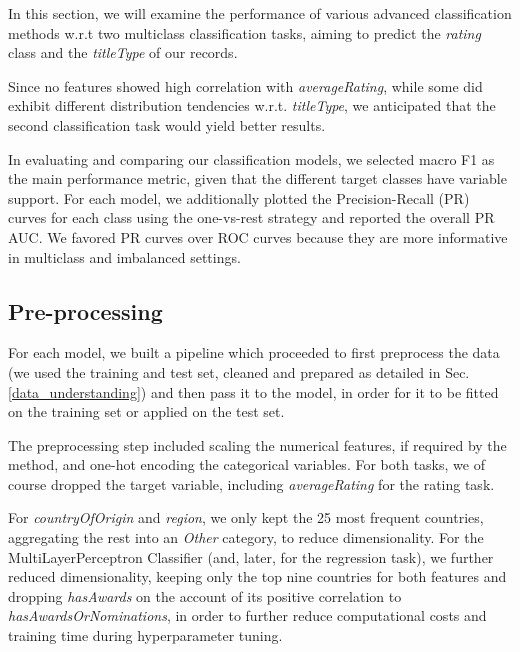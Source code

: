 In this section, we  will examine the performance of various advanced classification methods w.r.t two multiclass classification tasks, aiming to predict the \textit{rating} class and the \textit{titleType} of our records.

Since no features showed high correlation with \textit{averageRating}, while some did exhibit different distribution tendencies w.r.t. \textit{titleType}, we anticipated that the second classification task would yield better results.

In evaluating and comparing our classification models, we selected macro F1 as the main performance metric, given that the different target classes have variable support. For each model, we additionally plotted the Precision-Recall (PR) curves for each class using the one-vs-rest strategy and reported the overall PR AUC. We favored PR curves over ROC curves because they are more informative in multiclass and imbalanced settings.

\subsection{Pre-processing}
\label{classification_preprocessing}
For each model, we built a pipeline which proceeded to first preprocess the data (we used the training and test set, cleaned and prepared as detailed in Sec. \ref{data_understanding}) and then pass it to the model, in order for it to be fitted on the training set or applied on the test set.

The preprocessing step included scaling the numerical features, if required by the method, and one-hot encoding the categorical variables. For both tasks, we of course dropped the target variable, including \textit{averageRating} for the rating task.

For \textit{countryOfOrigin} and \textit{region}, we only kept the 25 most frequent countries, aggregating the rest into an \textit{Other} category, to reduce dimensionality. For the MultiLayerPerceptron Classifier (and, later, for the regression task), we further reduced dimensionality, keeping only the top nine countries for both features and dropping \textit{hasAwards} on the account of its positive correlation to \textit{hasAwardsOrNominations}, in order to further reduce computational costs and training time during hyperparameter tuning. 

